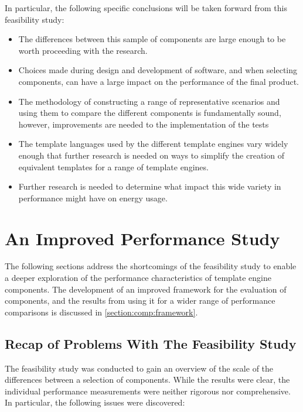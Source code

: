 In particular, the following specific conclusions will be taken forward from this feasibility study:

\begin{itemize}
\item The differences between this sample of components are large enough to be worth proceeding with the research.
\item Choices made during design and development of software, and when selecting components, can have a large impact on the performance of the final product.
\item The methodology of constructing a range of representative scenarios and using them to compare the different components is fundamentally sound, however, improvements are needed to the implementation of the tests
\item The \gls{template language}s used by the different \gls{template engine}s vary widely enough that further research is needed on ways to simplify the creation of equivalent templates for a range of \gls{template engine}s.
\item Further research is needed to determine what impact this wide variety in performance might have on energy usage.
\end{itemize}

\section{An Improved Performance Study}
\label{section:fs2}

The following sections address the shortcomings of the feasibility study to enable a deeper exploration of the performance characteristics of \gls{template engine} components.  The development of an improved framework for the evaluation of components, and the results from using it for a wider range of performance comparisons is discussed in \autoref{section:comp:framework}.

\subsection{Recap of Problems With The Feasibility Study}
\label{section:comp:recap}

The feasibility study was conducted to gain an overview of the scale of the differences between a selection of components. While the results were clear, the individual performance measurements were neither rigorous nor comprehensive. In particular, the following issues were discovered:

